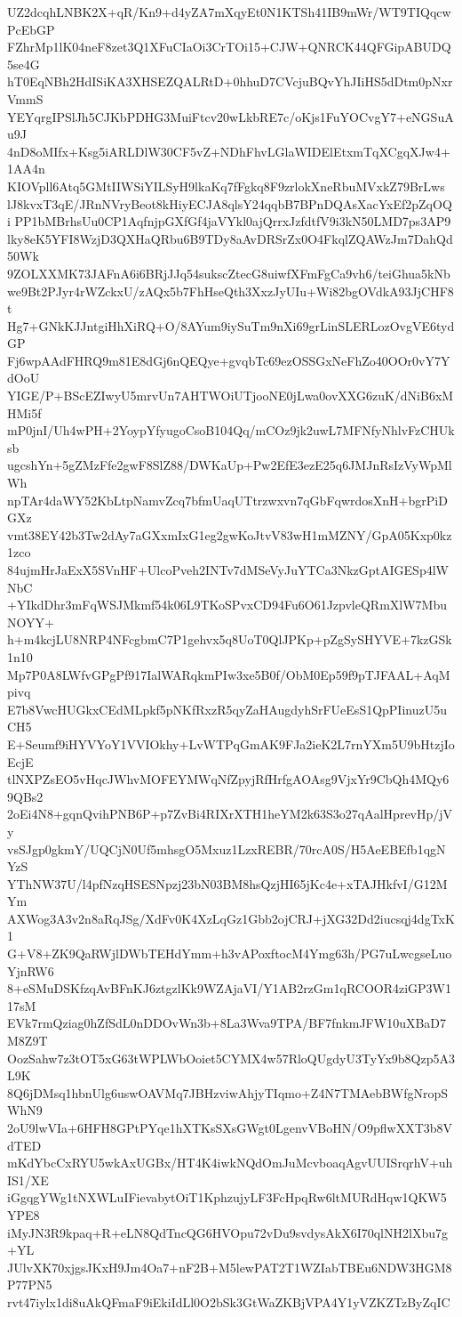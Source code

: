 UZ2dcqhLNBK2X+qR/Kn9+d4yZA7mXqyEt0N1KTSh41IB9mWr/WT9TIQqcwPcEbGP
FZhrMp1lK04neF8zet3Q1XFuCIaOi3CrTOi15+CJW+QNRCK44QFGipABUDQ5se4G
hT0EqNBh2HdISiKA3XHSEZQALRtD+0hhuD7CVcjuBQvYhJIiHS5dDtm0pNxrVmmS
YEYqrgIPSlJh5CJKbPDHG3MuiFtcv20wLkbRE7c/oKjs1FuYOCvgY7+eNGSuAu9J
4nD8oMIfx+Ksg5iARLDlW30CF5vZ+NDhFhvLGlaWIDElEtxmTqXCgqXJw4+1AA4n
KIOVpll6Atq5GMtIIWSiYILSyH9lkaKq7fFgkq8F9zrlokXneRbuMVxkZ79BrLws
lJ8kvxT3qE/JRnNVryBeot8kHiyECJA8qlsY24qqbB7BPnDQAsXacYxEf2pZqOQi
PP1bMBrhsUu0CP1AqfnjpGXfGf4jaVYkl0ajQrrxJzfdtfV9i3kN50LMD7ps3AP9
lky8eK5YFI8WzjD3QXHaQRbu6B9TDy8aAvDRSrZx0O4FkqlZQAWzJm7DahQd50Wk
9ZOLXXMK73JAFnA6i6BRjJJq54sukscZtecG8uiwfXFmFgCa9vh6/teiGhua5kNb
we9Bt2PJyr4rWZckxU/zAQx5b7FhHseQth3XxzJyUIu+Wi82bgOVdkA93JjCHF8t
Hg7+GNkKJJntgiHhXiRQ+O/8AYum9iySuTm9nXi69grLinSLERLozOvgVE6tydGP
Fj6wpAAdFHRQ9m81E8dGj6nQEQye+gvqbTc69ezOSSGxNeFhZo40OOr0vY7YdOoU
YIGE/P+BScEZIwyU5mrvUn7AHTWOiUTjooNE0jLwa0ovXXG6zuK/dNiB6xMHMi5f
mP0jnI/Uh4wPH+2YoypYfyugoCsoB104Qq/mCOz9jk2uwL7MFNfyNhlvFzCHUksb
ugcshYn+5gZMzFfe2gwF8SlZ88/DWKaUp+Pw2EfE3ezE25q6JMJnRsIzVyWpMlWh
npTAr4daWY52KbLtpNamvZcq7bfmUaqUTtrzwxvn7qGbFqwrdosXnH+bgrPiDGXz
vmt38EY42b3Tw2dAy7aGXxmIxG1eg2gwKoJtvV83wH1mMZNY/GpA05Kxp0kz1zco
84ujmHrJaExX5SVnHF+UlcoPveh2INTv7dMSeVyJuYTCa3NkzGptAIGESp4lWNbC
+YIkdDhr3mFqWSJMkmf54k06L9TKoSPvxCD94Fu6O61JzpvleQRmXlW7MbuNOYY+
h+m4kcjLU8NRP4NFcgbmC7P1gehvx5q8UoT0QlJPKp+pZgSySHYVE+7kzGSk1n10
Mp7P0A8LWfvGPgPf917IalWARqkmPIw3xe5B0f/ObM0Ep59f9pTJFAAL+AqMpivq
E7b8VwcHUGkxCEdMLpkf5pNKfRxzR5qyZaHAugdyhSrFUeEsS1QpPIinuzU5uCH5
E+Seumf9iHYVYoY1VVIOkhy+LvWTPqGmAK9FJa2ieK2L7rnYXm5U9bHtzjIoEcjE
tlNXPZsEO5vHqcJWhvMOFEYMWqNfZpyjRfHrfgAOAsg9VjxYr9CbQh4MQy69QBs2
2oEi4N8+gqnQvihPNB6P+p7ZvBi4RIXrXTH1heYM2k63S3o27qAalHprevHp/jVy
vsSJgp0gkmY/UQCjN0Uf5mhsgO5Mxuz1LzxREBR/70rcA0S/H5AeEBEfb1qgNYzS
YThNW37U/l4pfNzqHSESNpzj23bN03BM8hsQzjHI65jKc4e+xTAJHkfvI/G12MYm
AXWog3A3v2n8aRqJSg/XdFv0K4XzLqGz1Gbb2ojCRJ+jXG32Dd2iucsqj4dgTxK1
G+V8+ZK9QaRWjlDWbTEHdYmm+h3vAPoxftocM4Ymg63h/PG7uLwcgseLuoYjnRW6
8+eSMuDSKfzqAvBFnKJ6ztgzlKk9WZAjaVI/Y1AB2rzGm1qRCOOR4ziGP3W117sM
EVk7rmQziag0hZfSdL0nDDOvWn3b+8La3Wva9TPA/BF7fnkmJFW10uXBaD7M8Z9T
OozSahw7z3tOT5xG63tWPLWbOoiet5CYMX4w57RloQUgdyU3TyYx9b8Qzp5A3L9K
8Q6jDMsq1hbnUlg6uswOAVMq7JBHzviwAhjyTIqmo+Z4N7TMAebBWfgNropSWhN9
2oU9lwVIa+6HFH8GPtPYqe1hXTKsSXsGWgt0LgenvVBoHN/O9pflwXXT3b8VdTED
mKdYbcCxRYU5wkAxUGBx/HT4K4iwkNQdOmJuMcvboaqAgvUUISrqrhV+uhIS1/XE
iGgqgYWg1tNXWLuIFievabytOiT1KphzujyLF3FcHpqRw6ltMURdHqw1QKW5YPE8
iMyJN3R9kpaq+R+eLN8QdTncQG6HVOpu72vDu9svdysAkX6I70qlNH2lXbu7g+YL
JUlvXK70xjgsJKxH9Jm4Oa7+nF2B+M5lewPAT2T1WZIabTBEu6NDW3HGM8P77PN5
rvt47iylx1di8uAkQFmaF9iEkiIdLl0O2bSk3GtWaZKBjVPA4Y1yVZKZTzByZqIC
